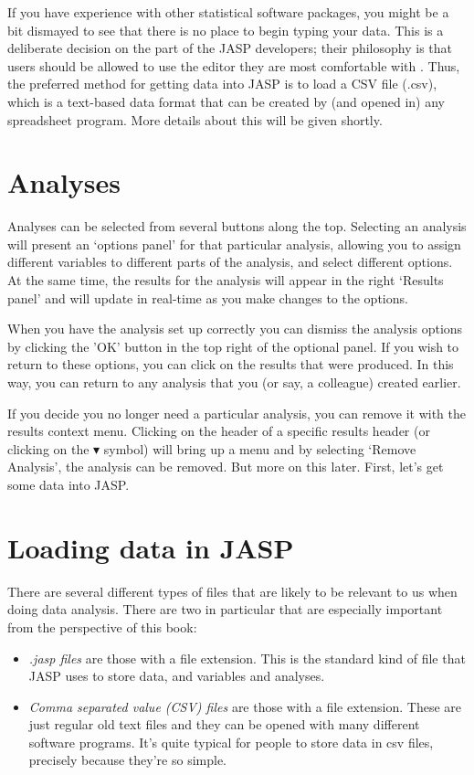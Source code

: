 If you have experience with other statistical software packages, you might be a bit dismayed to see that there is no place to begin typing your data. This is a deliberate decision on the part of the JASP developers; their philosophy is that users should be allowed to use the editor they are most comfortable with . Thus, the preferred method for getting data into JASP is to load a CSV file (.csv), which is a text-based data format that can be created by (and opened in) any spreadsheet program. More details about this will be given shortly. 

\section{Analyses\label{sec:analyses}}

Analyses can be selected from several buttons along the top. Selecting an analysis will present an ‘options panel’ for that particular analysis, allowing you to assign different variables to different parts of the analysis, and select different options. At the same time, the results for the analysis will appear in the right ‘Results panel’ and will update in real-time as you make changes to the options.

When you have the analysis set up correctly you can dismiss the analysis options by clicking the 'OK' button in the top right of the optional panel. If you wish to return to these options, you can click on the results that were produced. In this way, you can return to any analysis that you (or say, a colleague) created earlier.

If you decide you no longer need a particular analysis, you can remove it with the results context menu. Clicking on the header of a specific results header (or clicking on the $\blacktriangledown$ symbol) will bring up a menu and by selecting ‘Remove Analysis’, the analysis can be removed. But more on this later. First, let's get some data into JASP. %

\section{Loading data in JASP\label{sec:load}}

There are several different types of files that are likely to be relevant to us when doing data analysis. There are two in particular that are especially important from the perspective of this book:
\begin{itemize}
\item {\it .jasp files} are those with a  file extension. This is the standard kind of file that JASP uses to store data, and variables and analyses. 
\item {\it Comma separated value (CSV) files} are those with a  file extension. These are just regular old text files and they can be opened with many different software programs. It's quite typical for people to store data in csv files, precisely because they're so simple.
\end{itemize} 


